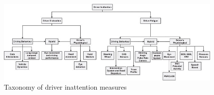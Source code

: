 \documentclass[11pt, parskip=half*,twoside=false]{scrbook}
\begin{document}
\begin{figure} 
	\centering
	\includegraphics[width=\textwidth]{inattention_inputs_taxonomy} 
	\caption{Taxonomy of driver inattention measures}
	\label{fig:taxonomy_measures}
\end{figure}
\end{document}
